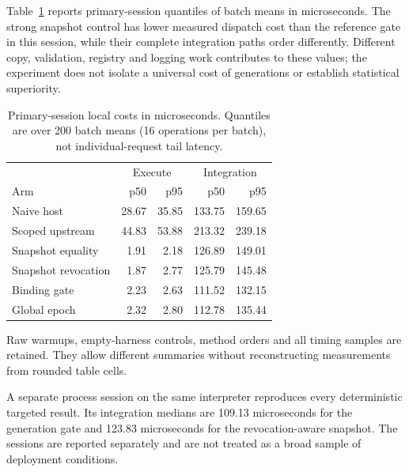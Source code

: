 Table~\ref{tab:timing} reports primary-session quantiles of batch means in microseconds. The strong snapshot control has lower measured dispatch cost than the reference gate in this session, while their complete integration paths order differently. Different copy, validation, registry and logging work contributes to these values; the experiment does not isolate a universal cost of generations or establish statistical superiority.

\begin{table}[t]\centering\small

\caption{Primary-session local costs in microseconds. Quantiles are over 200 batch means (16 operations per batch), not individual-request tail latency.}\label{tab:timing}

\begin{tabular}{lrrrr}\hline

&\multicolumn{2}{c}{Execute}&\multicolumn{2}{c}{Integration}\\

Arm & p50 & p95 & p50 & p95\\\hline

Naive host & 28.67 & 35.85 & 133.75 & 159.65 \\

Scoped upstream & 44.83 & 53.88 & 213.32 & 239.18 \\

Snapshot equality & 1.91 & 2.18 & 126.89 & 149.01 \\

Snapshot revocation & 1.87 & 2.77 & 125.79 & 145.48 \\

Binding gate & 2.23 & 2.63 & 111.52 & 132.15 \\

Global epoch & 2.32 & 2.80 & 112.78 & 135.44 \\

\hline\end{tabular}\end{table}

Raw warmups, empty-harness controls, method orders and all timing samples are retained. They allow different summaries without reconstructing measurements from rounded table cells.

A separate process session on the same interpreter reproduces every deterministic targeted result. Its integration medians are 109.13 microseconds for the generation gate and 123.83 microseconds for the revocation-aware snapshot. The sessions are reported separately and are not treated as a broad sample of deployment conditions.

